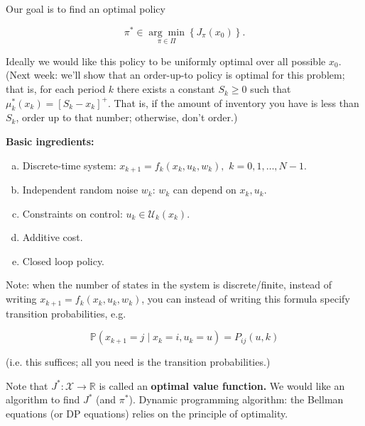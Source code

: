 Our goal is to find an optimal policy

\[
\pi^* \in \underset{\pi \in \Pi}{\arg \min} \left\{ J_\pi(x_0) \right\} .
\]

Ideally we would like this policy to be uniformly optimal over all possible \(x_0\). (Next week: we'll show that an order-up-to policy is optimal for this problem; that is, for each period \(k\) there exists a constant \(S_k \geq 0\) such that \(\mu_k^*(x_k) = [S_k - x_k]^+\). That is, if the amount of inventory you have is less than \(S_k\), order up to that number; otherwise, don't order.)


\textbf{Basic ingredients:}

\begin{enumerate}[(a)]

\item Discrete-time system: \(x_{k+1} = f_k(x_k, u_k, w_k),\) \(k = 0, 1, \ldots, N-1\).

\item Independent random noise \(w_k\): \(w_k\) can depend on \(x_k, u_k\). 

\item Constraints on control: \(u_k \in \mathcal{U}_k(x_k)\).

\item Additive cost.

\item Closed loop policy.



\end{enumerate}

Note: when the number of states in the system is discrete/finite, instead of writing \(x_{k+1} = f_k(x_k, u_k, w_k)\), you can instead of writing this formula specify transition probabilities, e.g.

\[
\mathbb{P} \left(x_{k+1} = j \mid x_k = i, u_k = u \right) = P_{ij}(u, k)
\]

(i.e. this suffices; all you need is the transition probabilities.)

Note that \(J^*: \mathcal{X} \to \mathbb{R}\) is called an \textbf{optimal value function.} We would like an algorithm to find \(J^*\) (and \(\pi^*\)). Dynamic programming algorithm: the Bellman equations (or DP equations) relies on the principle of optimality.

